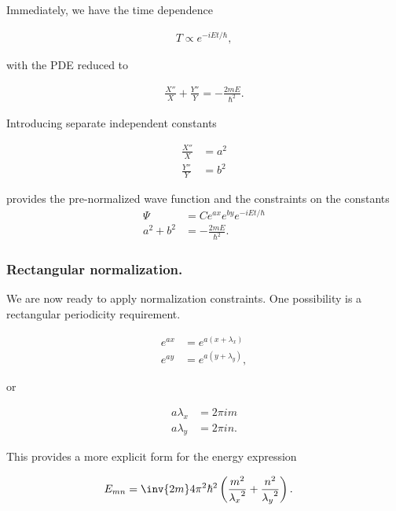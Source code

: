 Immediately, we have the time dependence

\begin{align}\label{eqn:desaiCh4:102}
T \propto e^{-i E t/\hbar},
\end{align}

with the PDE reduced to 

\begin{align}\label{eqn:desaiCh4:103}
\frac{X''}{X} +\frac{Y''}{Y} = - \frac{2m E}{\hbar^2}.
\end{align}

Introducing separate independent constants 

\begin{align}\label{eqn:desaiCh4:104}
\frac{X''}{X} &= a^2 \\
\frac{Y''}{Y} &= b^2 
\end{align}

provides the pre-normalized wave function and the constraints on the constants
\begin{align}\label{eqn:desaiCh4:105}
\Psi &= C 
e^{ax}
e^{by}
e^{-iE t/\hbar} \\
a^2 + b^2 &= -\frac{2 m E}{\hbar^2}.
\end{align}

\subsubsection{Rectangular normalization.}

We are now ready to apply normalization constraints.  One possibility is a rectangular periodicity requirement.

\begin{align}\label{eqn:desaiCh4:107}
e^{ax} &= e^{a(x + \lambda_x)} \\
e^{ay} &= e^{a(y + \lambda_y)} ,
\end{align}

or

\begin{align}\label{eqn:desaiCh4:108}
a\lambda_x &= 2 \pi i m \\
a\lambda_y &= 2 \pi i n.
\end{align}

This provides a more explicit form for the energy expression

\begin{align}\label{eqn:desaiCh4:109}
E_{mn} &= \inv{2m} 4 \pi^2 \hbar^2 \left( 
\frac{m^2}{{\lambda_x}^2}
+\frac{n^2}{{\lambda_y}^2}
\right).
\end{align}

